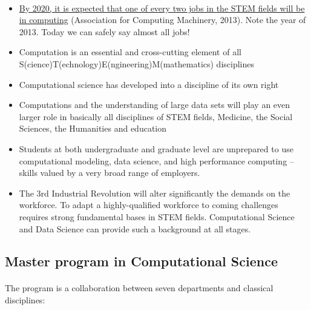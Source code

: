 \documentclass[%
oneside,                 %
final,                   %
10pt]{article}
\begin{document}
\paragraph{}
\begin{itemize}
\item \href{{http://pathways.acm.org/executive-summary.html}}{By 2020, it is expected that one of every two jobs in the STEM fields will be in computing} (Association for Computing Machinery, 2013). Note the year of 2013. Today we can safely say almost all jobs!

\item Computation is an essential and cross-cutting element of all S(cience)T(echnology)E(ngineering)M(mathematics) disciplines

\item Computational science has developed into a discipline of its own right

\item Computations and the understanding of large data sets will play an even larger role in basically all disciplines of STEM fields, Medicine, the Social Sciences, the Humanities and  education

\item Students at both undergraduate and graduate level are unprepared to use computational modeling, data science, and high performance computing – skills valued by a very broad range of employers.

\item The 3rd Industrial Revolution will alter significantly the demands on the workforce. To adapt a highly-qualified workforce to coming challenges  requires strong fundamental bases in STEM fields. Computational Science and Data Science can provide such a background at all stages.
\end{itemize}

\noindent



\subsection*{Master program in Computational Science}

\paragraph{}

The program is a collaboration between seven departments and classical disciplines:
\end{document}
